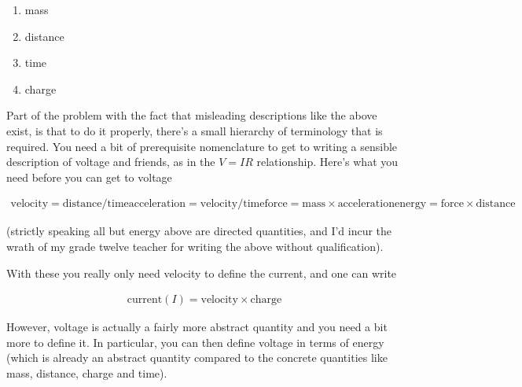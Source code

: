 \documentclass{article}
\begin{document}
\begin{enumerate}
\item mass
\item distance
\item time
\item charge
\end{enumerate}

Part of the problem with the fact that misleading descriptions like the above exist, is that to do it
properly, there's a small hierarchy of terminology that is required.  You need a bit
of prerequisite nomenclature to get to writing a sensible description of voltage and friends, as in
the $V = I R$ relationship.  Here's what you need 
before you can get to voltage

\begin{align*}
\text{velocity} = \text{distance}/ \text{time}
\text{acceleration} = \text{velocity} / \text{time}
\text{force} = \text{mass} \times \text{acceleration}
\text{energy} = \text{force} \times \text{distance}
\end{align*}

(strictly speaking all but energy above are directed quantities, and I'd incur the wrath of my grade twelve teacher for
 writing the above without qualification).

With these you really only need velocity to define the current, and one can write

\begin{align*}
\text{current} (I) = \text{velocity} \times \text{charge}
\end{align*}

However, voltage is actually a fairly more abstract quantity and you need a bit more to define it.
In particular, you can then define voltage in terms of energy (which is already an abstract quantity compared to
the concrete quantities like mass, distance, charge and time).
\end{document}
